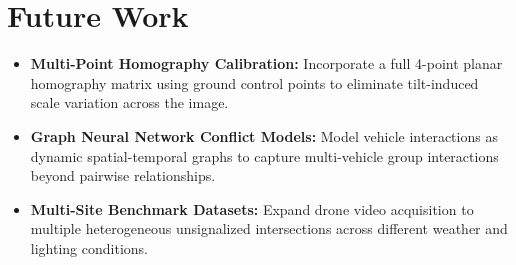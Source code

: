 \section{Future Work}

\begin{itemize}
    \item \textbf{Multi-Point Homography Calibration:} Incorporate a full 4-point planar homography matrix using ground control
          points to eliminate tilt-induced scale variation across the image.
    \item \textbf{Graph Neural Network Conflict Models:} Model vehicle interactions as dynamic spatial-temporal graphs
          to capture multi-vehicle group interactions beyond pairwise relationships.
    \item \textbf{Multi-Site Benchmark Datasets:} Expand drone video acquisition to multiple heterogeneous unsignalized
          intersections across different weather and lighting conditions.
\end{itemize}